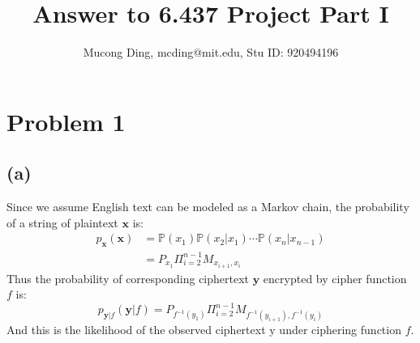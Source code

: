 \documentclass[12pt,aps,pre,reprint]{revtex4-1}
\begin{document}
\title{Answer to 6.437 Project Part I}

\author{Mucong Ding, mcding@mit.edu, Stu ID: 920494196}

\maketitle

\section{Problem 1}
\subsection{(a)}
Since we assume English text can be modeled as a Markov chain, the probability of a string of plaintext $\mathbf{x}$ is:
\begin{equation}
\begin{split}
	p_{\mathbf{x}}(\mathbf{x}) & = \mathbb{P}(x_1)\mathbb{P}(x_2|x_1)\cdots\mathbb{P}(x_n|x_{n-1})\\ 
	& = P_{x_1}\Pi_{i=2}^{n-1}M_{x_{i+1},x_i}
\end{split}
\end{equation}
Thus the probability of corresponding ciphertext $\mathbf{y}$ encrypted by cipher function $f$ is:
\begin{equation}
\label{likelihood}
	p_{\mathbf{y}|f}(\mathbf{y}|f) = P_{f^{-1}(y_1)}\Pi_{i=2}^{n-1}M_{f^{-1}(y_{i+1}),f^{-1}(y_i)}
\end{equation}
And this is the likelihood of the observed ciphertext $\mathrm{y}$ under ciphering function $f$.
\end{document}
